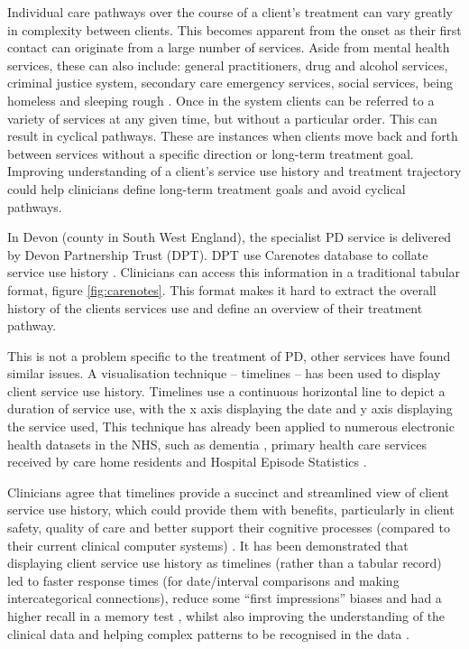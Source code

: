 \documentclass{article}
\begin{document}
Individual care pathways over the course of a client's treatment can vary greatly in complexity between clients. This becomes apparent from the onset as their first contact can originate from a large number of services. Aside from mental health services, these can also include: general practitioners, drug and alcohol services, criminal justice system, secondary care emergency services, social services, being homeless and sleeping rough \cite{Bolton2014}. Once in the system clients can be referred to a variety of services at any given time, but without a particular order. This can result in cyclical pathways. These are instances when clients move back and forth between services without a specific direction or long-term treatment goal. Improving understanding of a client’s service use history and treatment trajectory could help clinicians define long-term treatment goals and avoid cyclical pathways.

In Devon (county in South West England), the specialist PD service is delivered by Devon Partnership Trust (DPT). DPT use Carenotes database to collate service use history \cite{Advanced}. Clinicians can access this information in a traditional tabular format, figure \ref{fig:carenotes}. This format makes it hard to extract the overall history of the clients services use and define an overview of their treatment pathway.

This is not a problem specific to the treatment of PD, other services have found similar issues. A visualisation technique – timelines \cite{Cousins1991} – has been used to display client service use history. Timelines use a continuous horizontal line to depict a duration of service use, with the x axis displaying the date and y axis displaying the service used, This technique has already been applied to numerous electronic health datasets in the NHS, such as dementia \cite{Carey2016},  primary health care services received by care home residents \cite{Goodman2013} and Hospital Episode Statistics \cite{England2013}.

Clinicians agree that timelines provide a succinct and streamlined view of client service use history, which could provide them with benefits, particularly in client safety, quality of care and better support their cognitive processes (compared to their current clinical computer systems) \cite{Gill2010}. It has been demonstrated that displaying client service use history as timelines (rather than a tabular record) led to faster response times (for date/interval comparisons and making intercategorical connections), reduce some “first impressions” biases and had a higher recall in a memory test \cite{Alonso1998}, whilst also improving the understanding of the clinical data and helping complex patterns to be recognised in the data \cite{Ledesma2019}.
\end{document}
